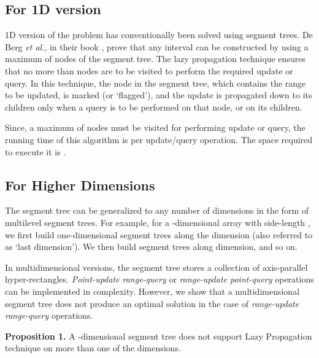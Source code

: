 \documentclass[a4paper]{article}
\begin{document}
\subsection{For 1D version}
1D version of the problem has conventionally been solved using segment trees. De Berg \textit{et al.}, in their book \cite[p. 226]{ST}, prove that any interval  can be constructed by using a maximum of  nodes of the segment tree. The lazy propagation technique ensures that no more than  nodes are to be visited to perform the required update or query. In this technique, the node in the segment tree, which contains the range to be updated, is marked (or `flagged'), and the update is propagated down to its children only when a query is to be performed on that node, or on its children.

\vspace{2 mm}
Since, a maximum of  nodes must be visited for performing update or query, the running time of this algorithm is  per update/query operation. The space required to execute it is .\cite[p. 226-227]{ST}



\subsection{For Higher Dimensions}
The segment tree can be generalized to any number of dimensions in the form of multilevel segment trees. For example, for a -dimensional array with side-length , we first build one-dimensional segment trees along the  dimension (also referred to as `last dimension'). We then build segment trees along  dimension, and so on. 

\vspace{2 mm}
In multidimensional versions, the segment tree stores a collection of axis-parallel hyper-rectangles. \textit{Point-update range-query} or \textit{range-update point-query} operations can be implemented in  complexity. However, we show that a multidimensional segment tree does not produce an optimal solution in the case of \textit{range-update range-query} operations.

\vspace{2 mm}
\noindent
\textbf{Proposition 1.} A -dimensional segment tree does not support Lazy Propagation technique on more than one of the dimensions.
\end{document}
